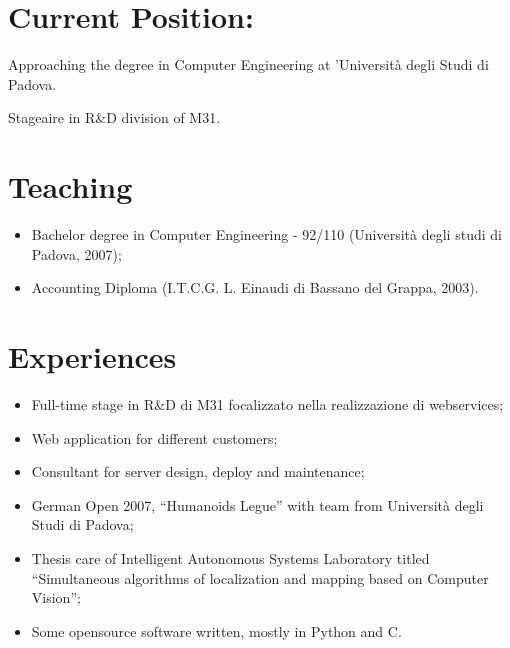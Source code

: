 \documentclass[pdftex, a4paper, 11pt]{article}
\begin{document}
\section*{Current Position:}

\hspace{0.58cm}Approaching the degree in Computer Engineering at 'Universit\`a degli Studi di Padova. 

Stageaire in R\&D division of M31.



\section*{Teaching}
\begin{itemize}
\item Bachelor degree in Computer Engineering - 92/110 (Universit\`a degli studi di Padova, 2007);
\item Accounting Diploma (I.T.C.G. L. Einaudi di Bassano del Grappa, 2003).
\end{itemize}

\section*{Experiences}
\begin{itemize}
\item Full-time stage in R\&D di M31 focalizzato nella realizzazione di 
  webservices;
\item Web application for different customers;
\item Consultant for server design, deploy and maintenance;
\item German Open 2007, ``Humanoids Legue'' with team from Universit\`a
degli Studi di Padova;
\item Thesis care of Intelligent Autonomous Systems Laboratory titled ``Simultaneous
algorithms of localization and mapping based on Computer Vision'';
\item Some opensource software written, mostly in Python and C.
\end{itemize}
\end{document}
